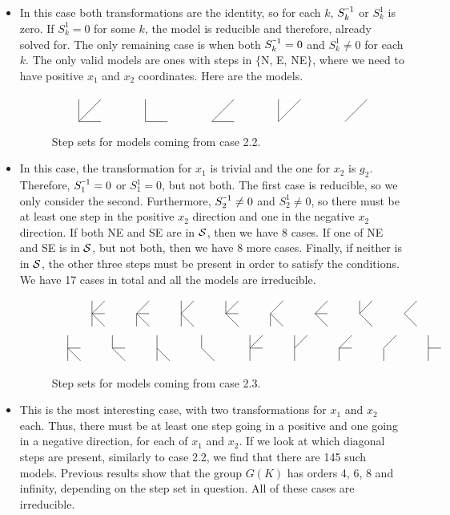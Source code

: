 \begin{itemize}
	\item[Case 2.2:] In this case both transformations are the identity, so for each $k$, $S_k^{\um 1}$ or $S_k^1$ is zero. If $S_k^1 = 0$ for some $k$, the model is reducible and therefore, already solved for. The only remaining case is when both $S_k^{\um 1} = 0$ and $S_k^1 \neq 0$ for each $k$. The only valid models are ones with steps in $\{$N, E, NE$\}$, where we need to have positive $x_1$ and $x_2$ coordinates. Here are the models.
	\begin{figure}[H]
	\centering
	\[
		\modelgraphC 111 \quad\modelgraphC 101 \quad \modelgraphC 011 \quad \modelgraphC 110 \quad \modelgraphC 010
	\]
	\caption{Step sets for \classic \twoD models coming from case 2.2.}
	\end{figure}
	\item[Case 2.3:] In this case, the transformation for $x_1$ is trivial and the one for $x_2$ is $g_2$. Therefore, $S_1^{\um 1} = 0$ or $S_1^{1} = 0$, but not both. The first case is reducible, so we only consider the second. Furthermore, $S_2^{\um 1} \neq 0$ and $S_2^1 \neq 0$, so there must be at least one step in the positive $x_2$ direction and one in the negative $x_2$ direction. If both NE and SE are in $\mathcal{S}$, then we have 8 cases. If one of NE and SE is in $\mathcal{S}$, but not both, then we have 8 more cases. Finally, if neither is in $\mathcal{S}$, the other three steps must be present in order to satisfy the conditions. We have 17 cases in total and all the models are irreducible.
	\begin{figure}[H]
		\centering
		\begin{align*}
			\modelgraph 01101011 \quad \modelgraph 00101011 \quad \modelgraph 01100011 \quad \modelgraph 01101001 &\quad \modelgraph 00100011  \quad \modelgraph 00101001  \quad \modelgraph 01100001  \quad \modelgraph 00100001 \\
			\modelgraph 01001011 \quad \modelgraph 01001001 \quad \modelgraph 01000011 \quad \modelgraph 01000001 \quad\, \quad&\!\exxxx \modelgraph 01101010 \quad \modelgraph 01100010 \quad \modelgraph 00101010 \quad \modelgraph 00100010 \quad\modelgraph 01001010
		\end{align*}
		\caption{Step sets for \classic \twoD models coming from case 2.3.}
	\end{figure}
	\item[Case 3.3:] This is the most interesting case, with two transformations for $x_1$ and $x_2$ each. Thus, there must be at least one step going in a positive and one going in a negative direction, for each of $x_1$ and $x_2$. If we look at which diagonal steps are present, similarly to case 2.2, we find that there are 145 such models. Previous results show that the group $G(K)$ has orders 4, 6, 8 and infinity, depending on the step set in question. All of these cases are irreducible.
 \end{itemize}
 
